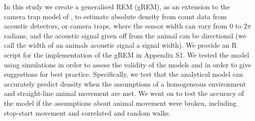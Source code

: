 In this study we create a generalised REM (gREM), as an extension to the camera trap model of \citep{rowcliffe2008estimating}, to estimate absolute density from count data from acoustic detectors, or camera traps, where the sensor width can vary from 0 to $2\pi$ radians, and the acoustic signal given off from the animal can be directional (we call the width of an animals acoustic signal a signal width). 
We provide an R \citep{R} script for the implementation of the gREM in Appendix S1.  
 We tested the model using simulations in order to assess the validity of the models and in order to give suggestions for best practice. Specifically, we test that the analytical model can accurately predict density when the assumptions of a homogeneous environment and straight-line animal movement are met. We went on to test the accuracy of the model if the assumptions about animal movement were broken, including stop-start movement and correlated and random walks.
